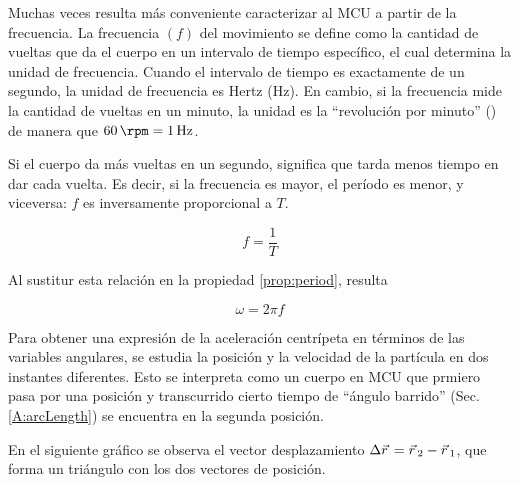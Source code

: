 Muchas veces resulta más conveniente caracterizar al MCU a partir de la frecuencia.
La frecuencia $(f)$ del movimiento se define como la cantidad de vueltas que da el cuerpo en un intervalo de tiempo específico, el cual determina la unidad de frecuencia.
Cuando el intervalo de tiempo es exactamente de un segundo, la unidad de frecuencia es Hertz (\si{\hertz}).
En cambio, si la frecuencia mide la cantidad de vueltas en un minuto, la unidad es la ``revolución por minuto'' (\si{\rpm}) de manera que $\SI{60}{\rpm} = \SI{1}{\hertz}$.

Si el cuerpo da más vueltas en un segundo, significa que tarda menos tiempo en dar cada vuelta.
Es decir, si la frecuencia es mayor, el período es menor, y viceversa: $f$ es inversamente proporcional a $T$.

\begin{mdframed}[style=PropertyFrame]
    \begin{prop}
    \end{prop}
    \begin{equation*}
        f = \dfrac{1}{T}
    \end{equation*}
\end{mdframed}

Al sustitur esta relación en la propiedad \ref{prop:period}, resulta

\begin{mdframed}[style=PropertyFrame]
    \begin{prop}
    \end{prop}
    \begin{equation*}
        \omega = 2 \pi f
    \end{equation*}
\end{mdframed}

Para obtener una expresión de la aceleración centrípeta en términos de las variables angulares, se estudia la posición y la velocidad de la partícula en dos instantes diferentes.
Esto se interpreta como un cuerpo en MCU que prmiero pasa por una posición y transcurrido cierto tiempo de ``ángulo barrido'' (Sec. \ref{A:arcLength}) se encuentra en la segunda posición.

\begin{center}
    \def\svgwidth{0.8\linewidth}
    
\end{center}

En el siguiente gráfico se observa el vector desplazamiento $\Delta \vec{r}\hspace{0.05cm} = \vec{r}\hspace{0.05cm}_2-\vec{r}\hspace{0.05cm}_1$, que forma un triángulo con los dos vectores de posición.

